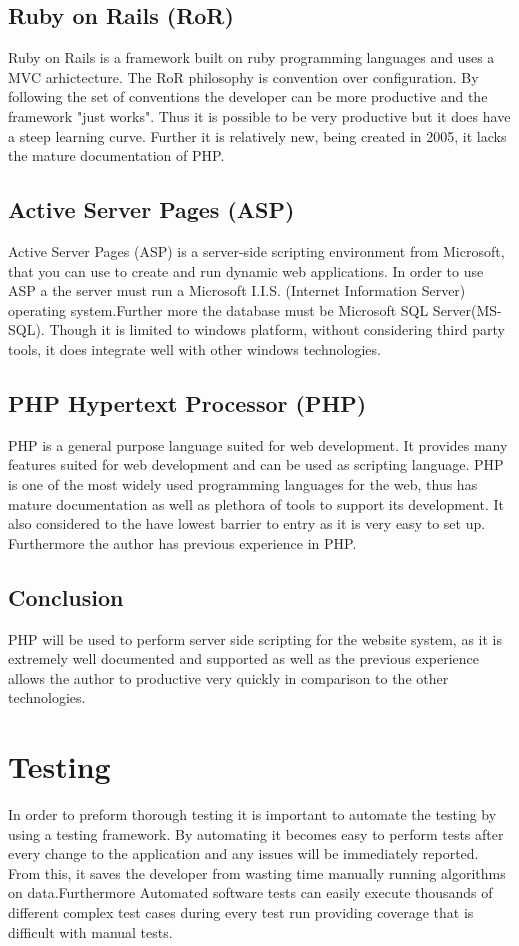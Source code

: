 \documentclass[a4paper,oneside,11pt]{report}
\begin{document}
\subsection{Ruby on Rails (RoR)}  
Ruby on Rails is a framework built on ruby programming languages and uses a MVC arhictecture. The RoR philosophy is convention over configuration. By following the set of conventions the developer can be more productive and the framework "just works". Thus it is possible to be very productive but it does have a steep learning curve. Further it is relatively new, being created in 2005, it lacks the mature documentation of PHP.

\subsection{ Active Server Pages (ASP)} 
 Active Server Pages (ASP) is a server-side scripting environment from Microsoft, that you can use to create and run dynamic web applications. In order to use ASP a the server must run a Microsoft I.I.S. (Internet Information Server) operating system.Further more the database must be Microsoft SQL Server(MS-SQL). Though it is limited to windows platform, without considering third party tools, it does integrate well with other windows technologies.
 
\subsection{PHP Hypertext Processor (PHP) } 
PHP is a general purpose language suited for web development. It provides many features suited for web development and can be used as scripting language. PHP is one of the most widely used programming languages for the web, thus has mature documentation as well as plethora of tools to support its development. It also considered to the have lowest barrier to entry as it is very easy to set up. Furthermore the author has previous experience in PHP.

\subsection{Conclusion}
PHP will be used to perform server side scripting for the website system, as it is extremely well documented and supported as well as the previous experience allows the author to productive very quickly in comparison to the other technologies.
\section{Testing}
In order to preform thorough testing it is important to automate the testing by using a testing framework. By automating it becomes easy to perform tests after every change to the application and any issues will be immediately reported. From this, it saves the developer from wasting time manually running algorithms on data.Furthermore Automated software tests can easily execute thousands of different complex test cases during every test run providing coverage that is difficult with manual tests.
\end{document}

